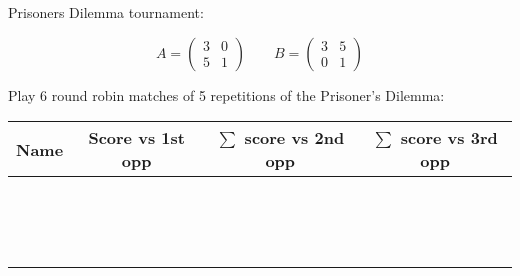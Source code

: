 \documentclass{article}
\begin{document}
Prisoners Dilemma tournament:

\[
   A =
   \begin{pmatrix}
       3 & 0\\
       5 & 1
   \end{pmatrix}\qquad
   B =
   \begin{pmatrix}
       3 & 5\\
       0 & 1
   \end{pmatrix}
\]

Play 6 round robin matches of 5 repetitions of the Prisoner's Dilemma:

\begin{center}
\begin{tabular}{r|c|c|c}
\toprule
Name         & Score vs 1st opp & \(\sum\) score vs 2nd opp &\(\sum\) score vs
3rd opp\\
\midrule
             &                     &                        & \\
             &                     &                        & \\
             &                     &                        & \\
             &                     &                        & \\
             &                     &                        & \\
             &                     &                        & \\
             &                     &                        & \\
             &                     &                        & \\
             &                     &                        & \\
             &                     &                        & \\
             &                     &                        & \\
             &                     &                        & \\
             &                     &                        & \\
             &                     &                        & \\
             &                     &                        & \\
\bottomrule
\end{tabular}
\end{center}
\end{document}
